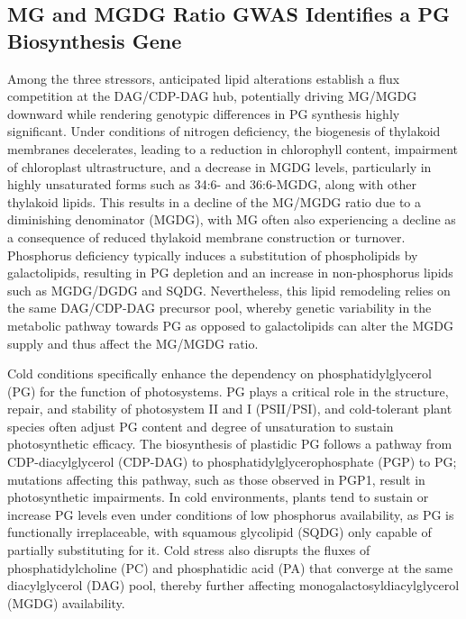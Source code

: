 \documentclass[10pt,letterpaper]{article}
\begin{document}
\subsection*{MG and MGDG Ratio GWAS Identifies a PG Biosynthesis Gene}
Among the three stressors, anticipated lipid alterations establish a flux competition at the DAG/CDP-DAG hub, potentially driving MG/MGDG downward while rendering genotypic differences in PG synthesis highly significant. Under conditions of nitrogen deficiency, the biogenesis of thylakoid membranes decelerates, leading to a reduction in chlorophyll content, impairment of chloroplast ultrastructure, and a decrease in MGDG levels, particularly in highly unsaturated forms such as 34:6- and 36:6-MGDG, along with other thylakoid lipids. This results in a decline of the MG/MGDG ratio due to a diminishing denominator (MGDG), with MG often also experiencing a decline as a consequence of reduced thylakoid membrane construction or turnover. Phosphorus deficiency typically induces a substitution of phospholipids by galactolipids, resulting in PG depletion and an increase in non-phosphorus lipids such as MGDG/DGDG and SQDG. Nevertheless, this lipid remodeling relies on the same DAG/CDP-DAG precursor pool, whereby genetic variability in the metabolic pathway towards PG as opposed to galactolipids can alter the MGDG supply and thus affect the MG/MGDG ratio.

Cold conditions specifically enhance the dependency on phosphatidylglycerol (PG) for the function of photosystems. PG plays a critical role in the structure, repair, and stability of photosystem II and I (PSII/PSI), and cold-tolerant plant species often adjust PG content and degree of unsaturation to sustain photosynthetic efficacy. The biosynthesis of plastidic PG follows a pathway from CDP-diacylglycerol (CDP-DAG) to phosphatidylglycerophosphate (PGP) to PG; mutations affecting this pathway, such as those observed in PGP1, result in photosynthetic impairments. In cold environments, plants tend to sustain or increase PG levels even under conditions of low phosphorus availability, as PG is functionally irreplaceable, with squamous glycolipid (SQDG) only capable of partially substituting for it. Cold stress also disrupts the fluxes of phosphatidylcholine (PC) and phosphatidic acid (PA) that converge at the same diacylglycerol (DAG) pool, thereby further affecting monogalactosyldiacylglycerol (MGDG) availability.
\end{document}

